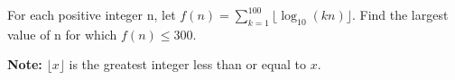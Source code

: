For each positive integer n, let $ f(n) = \sum_{k = 1}^{100} \lfloor \log_{10} (kn) \rfloor$. Find the largest value of n for which $ f(n) \le 300$.

\textbf{Note:} $ \lfloor x \rfloor$ is the greatest integer less than or equal to $ x$.